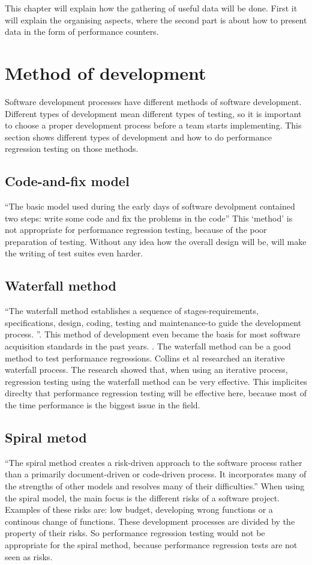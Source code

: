 This chapter will explain how the gathering of useful data will be done. First it will explain the organising aspects, where the second part is about how to present data in the form of performance counters.
\section{Method of development}
Software development processes have different methods of software development. Different types of development mean different types of testing, so it is important to choose a proper development process before a team starts implementing. This section shows different types of development and how to do performance regression testing on those methods.
\subsection{Code-and-fix model}
``The basic model used during the early days of software devolpment contained two steps: write some code and fix the problems in the code'' \cite{boehm1988spiral} This `method' is not appropriate for performance regression testing, because of the poor preparation of testing. Without any idea how the overall design will be, will make the writing of test suites even harder.

\subsection{Waterfall method}
``The waterfall method establishes a sequence of stages-requirements, specifications, design, coding, testing and maintenance-to guide the development process. ''\cite{kang1989software}. This method of development even became the basis for most software acquisition standards in the past years. \cite{boehm1988spiral}. The waterfall method can be a good method to test performance regressions. Collins et al researched an iterative waterfall process. \cite{collins2010iterative} The research showed that, when using an iterative process, regression testing using the waterfall method can be very effective. This implicites direclty that performance regression testing will be effective here, because most of the time performance is the biggest issue in the field. \cite{foo2010mining}
\subsection{Spiral metod}
``The spiral method creates a risk-driven approach to the software process rather than a primarily document-driven or code-driven process. It incorporates many of the strengths
of other models and resolves many of their
difficulties.''\cite{boehm1988spiral} When using the spiral model, the main focus is the different risks of a software project. Examples of these risks are: low budget, developing wrong functions or a continous change of functions. These development processes are divided by the property of their risks. So performance regression testing would not be appropriate for the spiral method, because performance regression tests are not seen as risks.
